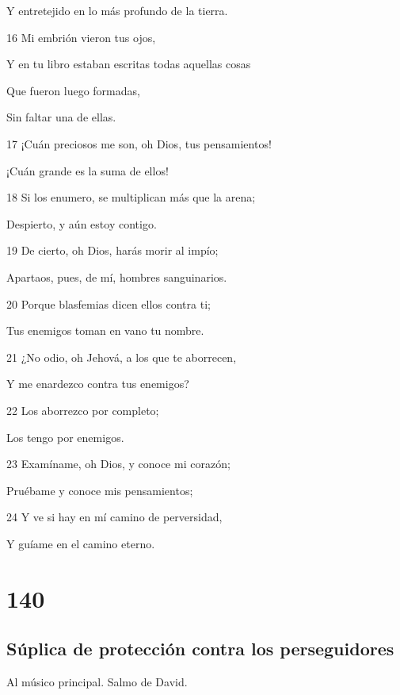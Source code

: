 \par Y entretejido en lo más profundo de la tierra.
\par 16 Mi embrión vieron tus ojos,
\par Y en tu libro estaban escritas todas aquellas cosas
\par Que fueron luego formadas,
\par Sin faltar una de ellas.
\par 17 ¡Cuán preciosos me son, oh Dios, tus pensamientos!
\par ¡Cuán grande es la suma de ellos!
\par 18 Si los enumero, se multiplican más que la arena;
\par Despierto, y aún estoy contigo.
\par 19 De cierto, oh Dios, harás morir al impío;
\par Apartaos, pues, de mí, hombres sanguinarios.
\par 20 Porque blasfemias dicen ellos contra ti;
\par Tus enemigos toman en vano tu nombre.
\par 21 ¿No odio, oh Jehová, a los que te aborrecen,
\par Y me enardezco contra tus enemigos?
\par 22 Los aborrezco por completo;
\par Los tengo por enemigos.
\par 23 Examíname, oh Dios, y conoce mi corazón;
\par Pruébame y conoce mis pensamientos;
\par 24 Y ve si hay en mí camino de perversidad,
\par Y guíame en el camino eterno.

\chapter{140}

\section*{Súplica de protección contra los perseguidores}

\par Al músico principal. Salmo de David.

